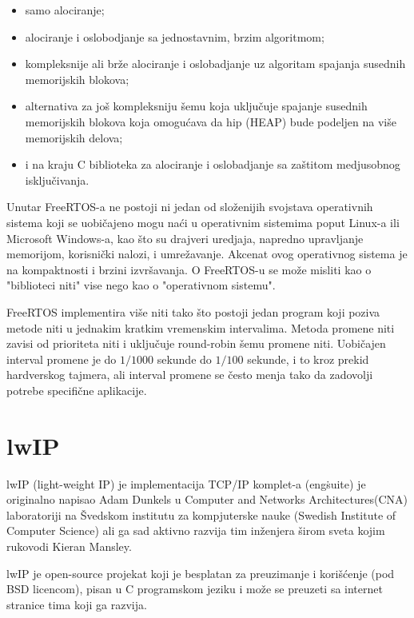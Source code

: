 \documentclass[a4paper,12pt, master]{etf}
\begin{document}
	\begin{itemize}
		\item samo alociranje;
		\item alociranje i oslobodjanje sa jednostavnim, brzim algoritmom;
		\item kompleksnije ali br\v{z}e alociranje i oslobadjanje uz algoritam
            spajanja susednih memorijskih blokova;
		\item alternativa za jo\v{s} kompleksniju \v{s}emu koja uklju\v{c}uje
		    spajanje susednih memorijskih blokova koja omogu\'{c}ava da hip
            (HEAP) bude podeljen na vi\v{s}e memorijskih delova;
		\item i na kraju C biblioteka za alociranje i oslobadjanje sa
    		za\v{s}titom medjusobnog isklju\v{c}ivanja.
	\end{itemize}

	Unutar FreeRTOS-a ne postoji ni jedan od slo\v{z}enijih svojstava
	operativnih sistema koji se	uobi\v{c}ajeno mogu na\'{c}i u operativnim
	sistemima poput Linux-a ili Microsoft Windows-a, kao \v{s}to su drajveri
	uredjaja, napredno upravljanje memorijom, korisni\v{c}ki nalozi, i
	umre\v{z}avanje. Akcenat ovog operativnog sistema je na kompaktnosti i
	brzini izvr\v{s}avanja. O FreeRTOS-u se mo\v{z}e misliti kao o "biblioteci
	niti" vise nego kao o "operativnom sistemu".

	FreeRTOS implementira vi\v{s}e niti tako \v{s}to postoji jedan program koji
	poziva metode niti u jednakim kratkim vremenskim intervalima. Metoda
	promene niti zavisi od prioriteta niti i uklju\v{c}uje round-robin \v{s}emu
	promene niti. Uobi\v{c}ajen interval promene je do $1/1000$ sekunde
	do $1/100$ sekunde, i to kroz prekid hardverskog tajmera, ali interval
	promene se \v{c}esto menja tako da zadovolji potrebe specifi\v{c}ne
	aplikacije.

	\section{lwIP}

	lwIP (light-weight IP) je implementacija TCP/IP komplet-a (eng\. suite) je
    originalno napisao Adam Dunkels u Computer and Networks Architectures(CNA)
    laboratoriji na \v{S}vedskom institutu za kompjuterske nauke (Swedish
    Institute of Computer Science) ali ga sad aktivno razvija tim in\v{z}enjera
    \v{s}irom sveta kojim rukovodi Kieran Mansley\@.

	lwIP je open-source projekat koji je besplatan za preuzimanje i
	kori\v{s}\'{c}enje (pod BSD	licencom), pisan u C programskom jeziku i
	mo\v{z}e se preuzeti sa internet stranice tima koji	ga razvija.
\end{document}

